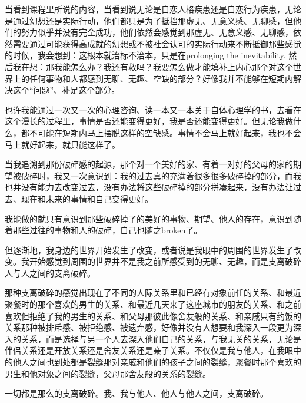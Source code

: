 当看到课程里所说的内容，当看到说无论是自恋人格疾患还是自恋行为疾患，无论是通过幻想还是实际行动，他们都只是为了抵挡那虚无、无意义感、无聊感，但他们的努力似乎并没有完全成功，他们依然会感觉到那虚无、无意义感、无聊感，依然需要通过可能获得高成就的幻想或不被社会认可的实际行动来不断抵御那些感觉的时候，我会想到：这根本就治标不治本，只是在prolonging the inevitability. 然后我在想：那我能怎么办？我还有救吗？我要怎么做才能填补上内心那个对这个世界上的任何事物和人都感到无聊、无趣、空缺的部分？好像我并不能够在短期内解决这个“问题”、补足这个部分。

也许我能通过一次又一次的心理咨询、读一本又一本关于自体心理学的书，去看在这个漫长的过程里，事情是否还能变得更好，我是否还能变得更好。但无论我做什么，都不可能在短期内马上摆脱这样的空缺感。事情不会马上就好起来，我也不会马上就好起来，就只能这样了。

当我追溯到那份破碎感的起源，那个对一个美好的家、有着一对好的父母的家的期望被破碎时，我又一次意识到：我的过去真的充满着很多很多破碎掉的部分，而我也并没有能力去改变过去，没有办法将这些破碎掉的部分拼凑起来，没有办法让过去、现在和未来的事情和自己变得更好。

我能做的就只有意识到那些破碎掉了的美好的事物、期望、他人的存在，意识到随着那些过往的事物和人的破碎，自己也随之broken了。

但逐渐地，我身边的世界开始发生了改变，或者说是我眼中的周围的世界发生了改变。我开始感觉到周围的世界并不是我之前所感受到的无聊、无趣，而是支离破碎\pozhehao{}人与人之间的支离破碎。

那种支离破碎的感觉出现在了不同的人际关系里\pozhehao{}和已经有对象前任的关系、和最近聚餐时的那个喜欢的男生的关系、和最近几天来了这座城市的朋友的关系、和之前喜欢但拒绝了我的男生的关系、和父母那彼此像舍友般的关系、和亲戚只有约饭的关系\pozhehao{}那种被排斥感、被拒绝感、被遗弃感，好像并没有人想要和我深入一段更为深入的关系，而是选择与另一个人去深入他们自己的关系，与我无关的关系，无论是伴侣关系还是开放关系还是舍友关系还是亲子关系。不仅仅是我与他人，在我眼中的他人之间也到处都是裂缝\pozhehao{}那对亲戚和他们的孩子之间的裂缝，聚餐时那个喜欢的男生和他对象之间的裂缝，父母那舍友般的关系的裂缝。

一切都是那么的支离破碎。我、我与他人、他人与他人之间，支离破碎。
